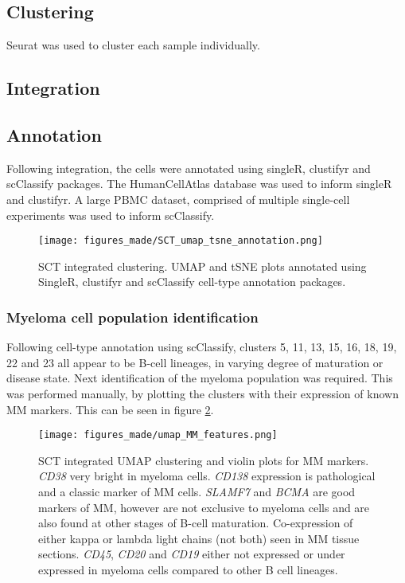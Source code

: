\subsection{Clustering}
Seurat was used to cluster each sample individually.

\subsection{Integration}

\subsection{Annotation}
Following integration, the cells were annotated using singleR, clustifyr and scClassify packages.
The HumanCellAtlas database was used to inform singleR and clustifyr.
A large PBMC dataset, comprised of multiple single-cell experiments was used to inform scClassify.

\begin{figure}[h]
\centering
\texttt{[image: figures\_made/SCT\_umap\_tsne\_annotation.png]}
\caption[Single-cell annotation]{SCT integrated clustering. UMAP and tSNE plots annotated using SingleR, clustifyr and scClassify cell-type annotation packages.}
\label{fig:sc_annotation}
\end{figure}

\subsubsection{Myeloma cell population identification}
Following cell-type annotation using scClassify, clusters 5, 11, 13, 15, 16, 18, 19, 22 and 23 all appear to be B-cell lineages, in varying degree of maturation or disease state.
Next identification of the myeloma population was required.
This was performed manually, by plotting the clusters with their expression of known MM markers.
This can be seen in figure \ref{fig:sc_mm_markers}.

\begin{figure}[phtb]
\centering
\texttt{[image: figures\_made/umap\_MM\_features.png]}
\caption[Single-cell MM features]{SCT integrated UMAP clustering and violin plots for MM markers. \textit{CD38} very bright in myeloma cells. \textit{CD138} expression is pathological and a classic marker of MM cells. \textit{SLAMF7} and \textit{BCMA} are good markers of MM, however are not exclusive to myeloma cells and are also found at other stages of B-cell maturation. Co-expression of either kappa or lambda light chains (not both) seen in MM tissue sections. \textit{CD45}, \textit{CD20} and \textit{CD19} either not expressed or under expressed in myeloma cells compared to other B cell lineages. }
\label{fig:sc_mm_markers}
\end{figure}


